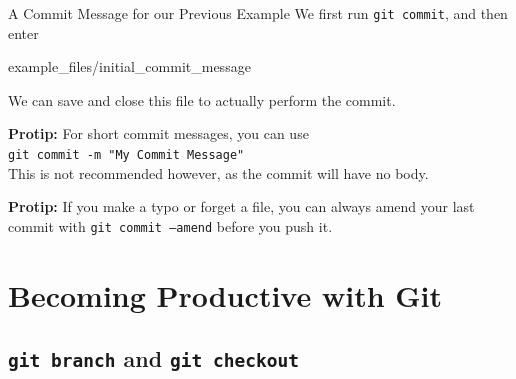 \documentclass[aspectratio=43]{beamer}
\begin{document}
\begin{frame}{A Commit Message for our Previous Example}
    We first run \texttt{git commit}, and then enter

        {example_files/initial_commit_message}
    
    We can save and close this file to actually perform the commit.
    
    \vspace{.5cm}

    \begin{footnotesize}
    \textbf{Protip:} For short commit messages, you can use\\
    \texttt{git commit -m "My Commit Message"}\\
    This is not recommended however, as the commit will have no body.
    \end{footnotesize}

    \vspace{.5cm}
    
    \begin{footnotesize}
    \textbf{Protip:} If you make a typo or forget a file, you can always amend
    your last commit with \texttt{git commit --amend} before you push it.
    \end{footnotesize}
\end{frame}

\section{Becoming Productive with Git}

\subsection{\texttt{git branch} and \texttt{git checkout}}
\end{document}
